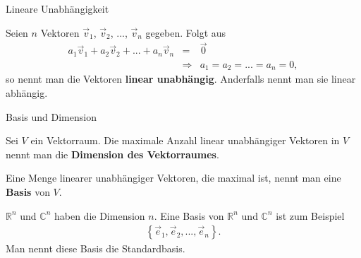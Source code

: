 \documentclass[german]{beamer}
\newcommand{\bq}{\begin{eqnarray*}}
\newcommand{\eq}{\end{eqnarray*}}
\begin{document}
\begin{frame}{Lineare Unabh\"angigkeit}

\begin{definition}
Seien $n$ Vektoren $\vec{v}_1$, $\vec{v}_2$, ..., $\vec{v}_n$ gegeben.
Folgt aus
\bq
 a_1 \vec{v}_1 + a_2 \vec{v}_2 + ... + a_n \vec{v}_n & = & \vec{0}
\nonumber \\
& \Rightarrow & a_1 = a_2 = ... = a_n = 0,
\eq
so nennt man die Vektoren {\bf linear unabh\"angig}. Anderfalls nennt man sie linear abh\"angig.
\end{definition}

\end{frame}

\begin{frame}{Basis und Dimension}

\begin{definition}
Sei $V$ ein Vektorraum. Die maximale Anzahl linear unabh\"angiger Vektoren
in $V$ nennt man die {\bf Dimension des Vektorraumes}.

Eine Menge linearer unabh\"angiger Vektoren, die maximal ist, nennt man eine {\bf Basis} von $V$.
\end{definition}

\begin{example}
${\mathbb R}^n$ und ${\mathbb C}^n$ haben die Dimension $n$. Eine Basis
von ${\mathbb R}^n$ und ${\mathbb C}^n$ ist zum Beispiel
\bq
 \left\{ \vec{e}_1, \vec{e}_2, ..., \vec{e}_n \right\}.
\eq
Man nennt diese Basis die Standardbasis.
\end{example}

\end{frame}
\end{document}
